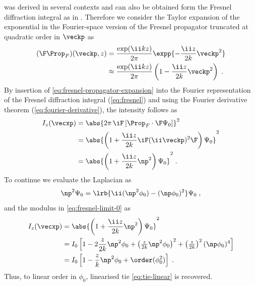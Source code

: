 \documentclass[
twoside,
openright,
titlepage,
numbers=noenddot,
headinclude,
fleqn,
a4paper,
footinclude=true,
cleardoublepage=empty,
abstractoff,
BCOR=5mm,
paper=a4,
fontsize=11pt,
british,ngerman,american,
]{scrreprt}
\begin{document}
 was derived in several contexts \cite{Nugent1996,
  PaganinBook} and can also be obtained form the Fresnel diffraction
integral as in \cite{Bronnikov2002}.  Therefore we consider the Taylor
expansion of the exponential in the Fourier-space version of the
Fresnel propagator truncated at quadratic order in $\veckp$ as
\begin{equation}
  \label{eq:fresnel-propagator-expansion}
  \begin{split}
    (\F\Prop_F)(\veckp,z) 
    & = \frac{\exp(\ii k z)}{2\pi}\expp{-\frac{\ii z}{2k}\veckp^2} 
    \\ & \approx \frac{\exp(\ii k z)}{2\pi}
    \left(1-\frac{\ii z}{2k}\veckp^2 \right) \;.
  \end{split}
\end{equation}
By insertion of \cref{eq:fresnel-propagator-expansion} into the
Fourier representation of the Fresnel diffraction integral
(\cref{eq:fresnel}) and using the Fourier derivative theorem
(\cref{eq:fourier-derivative}), the intensity follows as
\begin{equation}
  \begin{split}
  \label{eq:fresnel-limit-0}
  I_z(\vecxp) 
  & = \abs{2\pi\, \iF\left[ \Prop_F \cdot\F \Psi_0\right]}^2
  \\ & =  \abs{\left(1 +  
      \frac{\ii z}{2k} \iF (\ii\veckp)^2 \F\right) \Psi_0}^2
  \\ & =  \abs{\left(1 +  \frac{\ii z}{2k} 
      \np^2 \right) \Psi_0}^2 \;.
  \end{split}
\end{equation}
To continue we evaluate the Laplacian as
\begin{equation}
  \np^2\Psi_0=\lrb{\ii(\np^2\phi_0)-(\np\phi_0)^2}\Psi_0 \;,
\end{equation}
and the modulus in \cref{eq:fresnel-limit-0} as
\begin{equation}
  \begin{split}
  \label{eq:fresnel-limit-1}
  I_z(\vecxp) & =  \abs{\left(1 +  \frac{\ii z}{2k} 
      \np^2 \right) \Psi_0}^2
  \\ & = I_0\left[ 1 - 2\frac{z}{2k}\np^2\phi_0
    + \left(\tfrac{z}{2k}\np^2\phi_0\right)^2 
    + \left(\tfrac{z}{2k}\right)^2(\np\phi_0)^4 \right]
  \\ & = I_0\left[ 1 - \frac{z}{k}\np^2\phi_0 
    + \order(\phi_0^2) \right] \;.
  \end{split}
\end{equation}
Thus, to linear order in $\phi_0$, linearised \ac{tie}
\eqref{eq:tie-linear} is recovered.
\end{document}
